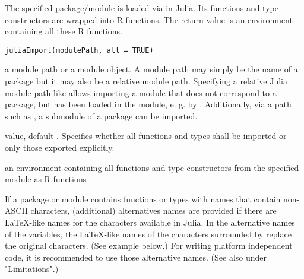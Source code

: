 %
\begin{Description}\relax
The specified package/module is loaded via  in Julia.
Its functions and type constructors are wrapped into R functions.
The return value is an environment containing all these R functions.
\end{Description}
%
\begin{Usage}
\begin{verbatim}
juliaImport(modulePath, all = TRUE)
\end{verbatim}
\end{Usage}
%
\begin{Arguments}
\begin{ldescription}
\item[\code{modulePath}] a module path or a module object.
A module path may simply be the name of a package but it may also
be a relative module path.
Specifying a relative Julia module path like 
allows importing a module that does not correspond to a package,
but has been loaded in the  module, e. g. by
.
Additionally, via a path such as ,
a submodule of a package can be imported.

\item[\code{all}]  value, default .
Specifies whether all functions and types shall be imported
or only those exported explicitly.
\end{ldescription}
\end{Arguments}
%
\begin{Value}
an environment containing all functions and type constructors
from the specified module as R functions
\end{Value}
%
\begin{Note}\relax
If a package or module contains functions or types with names that contain
non-ASCII characters, (additional) alternatives names are provided
if there are LaTeX-like names for the characters available in Julia.
In the alternative names of the variables, the LaTeX-like names of the
characters surrounded by  replace the original characters.
(See example below.)
For writing platform independent code, it is recommended to use those
alternative names.
(See also  under "Limitations".)
\end{Note}
%

